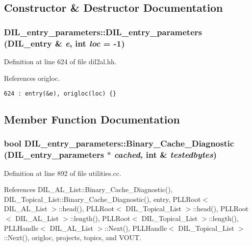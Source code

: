 \subsection{Constructor \& Destructor Documentation}
\subsubsection{\setlength{\rightskip}{0pt plus 5cm}DIL\_\-entry\_\-parameters::DIL\_\-entry\_\-parameters ({\bf DIL\_\-entry} \& {\em e}, int {\em loc} = -1)\hspace{0.3cm}{\tt  [inline]}}\label{classDIL__entry__parameters_a0}




Definition at line 624 of file dil2al.hh.

References origloc.



\footnotesize\begin{verbatim}624 : entry(&e), origloc(loc) {}
\end{verbatim}\normalsize 


\subsection{Member Function Documentation}
\subsubsection{\setlength{\rightskip}{0pt plus 5cm}bool DIL\_\-entry\_\-parameters::Binary\_\-Cache\_\-Diagnostic (DIL\_\-entry\_\-parameters $\ast$ {\em cached}, int \& {\em testedbytes})}\label{classDIL__entry__parameters_a8}




Definition at line 892 of file utilities.cc.

References DIL\_\-AL\_\-List::Binary\_\-Cache\_\-Diagnostic(), DIL\_\-Topical\_\-List::Binary\_\-Cache\_\-Diagnostic(), entry, PLLRoot$<$ DIL\_\-AL\_\-List $>$::head(), PLLRoot$<$ DIL\_\-Topical\_\-List $>$::head(), PLLRoot$<$ DIL\_\-AL\_\-List $>$::length(), PLLRoot$<$ DIL\_\-Topical\_\-List $>$::length(), PLLHandle$<$ DIL\_\-AL\_\-List $>$::Next(), PLLHandle$<$ DIL\_\-Topical\_\-List $>$::Next(), origloc, projects, topics, and VOUT.

